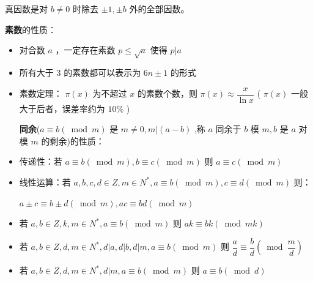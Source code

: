 \documentclass[twocolumn,10pt]{ctexart}
\begin{document}
\begin{notebox}
真因数是对 $b\neq 0$ 时除去 $\pm 1,\pm b$ 外的全部因数。
\end{notebox}

\textbf{素数}的性质：

\begin{itemize}
\item 对合数 $a$ ，一定存在素数 $p\le\sqrt a$ 使得 $p|a$
\item 所有大于 $3$ 的素数都可以表示为 $6n\pm 1$ 的形式
\item 素数定理： $\pi(x)$ 为不超过 $x$ 的素数个数，则 $\pi(x)\approx \dfrac{x}{\ln x}$ ( $\pi(x)$ 一般大于后者，误差率约为 $10\%$ )

\textbf{同余}($a\equiv b(\bmod m)$ 是 $m\neq 0,m|(a-b)$ ,称 $a$ 同余于 $b$ 模 $m,b$ 是 $a$ 对模 $m$ 的剩余)的性质：
\end{itemize}

\begin{itemize}
\item 传递性：若 $a\equiv b(\bmod m),\allowbreak{}b\equiv c(\bmod m)$ 则 $a\equiv c(\bmod m)$
\end{itemize}

\begin{itemize}
\item 线性运算：若 $a,\allowbreak{}b,\allowbreak{}c,\allowbreak{}d\in Z,\allowbreak{}m\in N^*,\allowbreak{}a\equiv b(\bmod m),\allowbreak{}c\equiv d(\bmod m)$ 则：

$a\pm c\equiv b\pm d(\bmod m),\allowbreak{}ac\equiv bd(\bmod m)$
\end{itemize}

\begin{itemize}
\item 若 $a,\allowbreak{}b\in Z,\allowbreak{}k,\allowbreak{}m\in N^*,\allowbreak{}a\equiv b(\bmod m)$ 则 $ak\equiv bk(\bmod mk)$
\end{itemize}

\begin{itemize}
\item 若 $a,\allowbreak{}b\in Z,\allowbreak{}d,\allowbreak{}m\in N^*,\allowbreak{}d|a,\allowbreak{}d|b,\allowbreak{}d|m,\allowbreak{}a\equiv b(\bmod m)$ 则 $\dfrac ad\equiv\dfrac bd(\bmod \dfrac md)$
\end{itemize}

\begin{itemize}
\item 若 $a,\allowbreak{}b\in Z,\allowbreak{}d,\allowbreak{}m\in N^*,\allowbreak{}d|m,\allowbreak{}a\equiv b(\bmod m)$ 则 $a\equiv b(\bmod d)$
\end{itemize}
\end{document}
